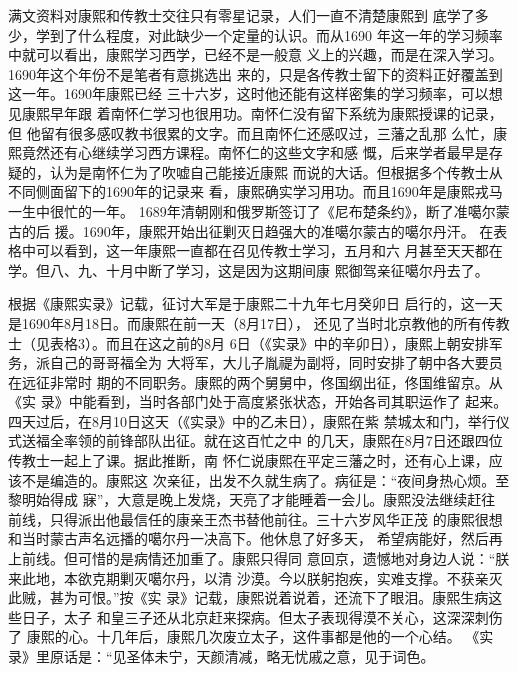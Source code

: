 满文资料对康熙和传教士交往只有零星记录，人们一直不清楚康熙到%
底学了多少，学到了什么程度，对此缺少一个定量的认识。而从1690%
年这一年的学习频率中就可以看出，康熙学习西学，已经不是一般意%
义上的兴趣，而是在深入学习。1690年这个年份不是笔者有意挑选出%
来的，只是各传教士留下的资料正好覆盖到这一年。1690年康熙已经%
三十六岁，这时他还能有这样密集的学习频率，可以想见康熙早年跟%
着南怀仁学习也很用功。南怀仁没有留下系统为康熙授课的记录，但%
他留有很多感叹教书很累的文字。而且南怀仁还感叹过，三藩之乱那%
么忙，康熙竟然还有心继续学习西方课程。南怀仁的这些文字和感%
慨，后来学者最早是存疑的，认为是南怀仁为了吹嘘自己能接近康熙%
而说的大话。但根据多个传教士从不同侧面留下的1690年的记录来%
看，康熙确实学习用功。而且1690年是康熙戎马一生中很忙的一年。%
1689年清朝刚和俄罗斯签订了《尼布楚条约》，断了准噶尔蒙古的后%
援。1690年，康熙开始出征剿灭日趋强大的准噶尔蒙古的噶尔丹汗。%
在表格中可以看到，这一年康熙一直都在召见传教士学习，五月和六%
月甚至天天都在学。但八、九、十月中断了学习，这是因为这期间康%
熙御驾亲征噶尔丹去了。%
\par
%
\par
根据《康熙实录》记载，征讨大军是于康熙二十九年七月癸卯日%
启行的，这一天是1690年8月18日。而康熙在前一天（8月17日），%
还见了当时北京教他的所有传教士（见表格3）。而且在这之前的8月%
6日（《实录》中的辛卯日），康熙上朝安排军务，派自己的哥哥福全为%
大将军，大儿子胤禔为副将，同时安排了朝中各大要员在远征非常时%
期的不同职务。康熙的两个舅舅中，佟国纲出征，佟国维留京。从《实%
录》中能看到，当时各部门处于高度紧张状态，开始各司其职运作了%
起来。四天过后，在8月10日这天（《实录》中的乙未日），康熙在紫%
禁城太和门，举行仪式送福全率领的前锋部队出征。就在这百忙之中%
的几天，康熙在8月7日还跟四位传教士一起上了课。据此推断，南%
怀仁说康熙在平定三藩之时，还有心上课，应该不是编造的。康熙这%
次亲征，出发不久就生病了。病征是：“夜间身热心烦。至黎明始得成%
寐”，大意是晚上发烧，天亮了才能睡着一会儿。康熙没法继续赶往%
前线，只得派出他最信任的康亲王杰书替他前往。三十六岁风华正茂%
的康熙很想和当时蒙古声名远播的噶尔丹一决高下。他休息了好多天，%
希望病能好，然后再上前线。但可惜的是病情还加重了。康熙只得同%
意回京，遗憾地对身边人说：“朕来此地，本欲克期剿灭噶尔丹，以清%
沙漠。今以朕躬抱疾，实难支撑。不获亲灭此贼，甚为可恨。”按《实%
录》记载，康熙说着说着，还流下了眼泪。康熙生病这些日子，太子%
和皇三子还从北京赶来探病。但太子表现得漠不关心，这深深刺伤了%
康熙的心。十几年后，康熙几次废立太子，这件事都是他的一个心结。%
《实录》里原话是：“见圣体未宁，天颜清减，略无忧戚之意，见于词色。%
